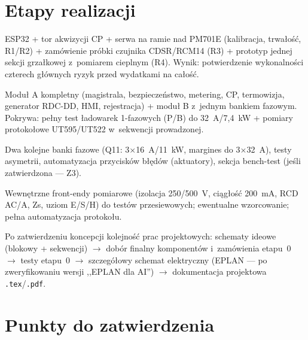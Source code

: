 \documentclass[11pt,a4paper]{article}
\begin{document}
\section{Etapy realizacji}
\label{sec:etapy}

\begin{description}[style=nextline]
\item[Etap 0 --- prototyp stołowy (weryfikacyjny).] ESP32 + tor akwizycji CP + serwa na ramie nad PM701E (kalibracja, trwałość, R1/R2) + zamówienie próbki czujnika CDSR/RCM14 (R3) + prototyp jednej sekcji grzałkowej z~pomiarem cieplnym (R4). Wynik: potwierdzenie wykonalności czterech głównych ryzyk przed wydatkami na całość.
\item[Etap 1 --- urządzenie użyteczne 1F.] Moduł A kompletny (magistrala, bezpieczeństwo, metering, CP, termowizja, generator RDC-DD, HMI, rejestracja) + moduł B z~jednym bankiem fazowym. Pokrywa: pełny test ładowarek 1-fazowych (P/B) do 32~A/7,4~kW + pomiary protokołowe UT595/UT522 w~sekwencji prowadzonej.
\item[Etap 2 --- rozbudowa 3F.] Dwa kolejne banki fazowe (Q11: 3$\times$16~A/11~kW, margines do 3$\times$32~A), testy asymetrii, automatyzacja przycisków błędów (aktuatory), sekcja bench-test (jeśli zatwierdzona --- Z3).
\item[Etap 3 --- rozszerzenia (opcjonalne).] Wewnętrzne front-endy pomiarowe (izolacja 250/500~V, ciągłość 200~mA, RCD AC/A, Zs, uziom E/S/H) do testów przesiewowych; ewentualne wzorcowanie; pełna automatyzacja protokołu.
\end{description}

Po zatwierdzeniu koncepcji kolejność prac projektowych: schematy ideowe (blokowy + sekwencji) $\rightarrow$ dobór finalny komponentów i~zamówienia etapu~0 $\rightarrow$ testy etapu~0 $\rightarrow$ szczegółowy schemat elektryczny (EPLAN --- po zweryfikowaniu wersji ,,EPLAN dla AI'') $\rightarrow$ dokumentacja projektowa \texttt{.tex}/\texttt{.pdf}.

\section{Punkty do zatwierdzenia}
\label{sec:zatwierdzenie}
\end{document}
